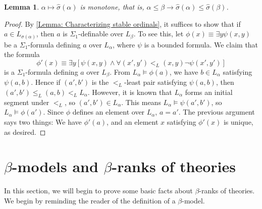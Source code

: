 \documentclass{amsart}
\newtheorem{lemma}[theorem]{Lemma}
\theoremstyle{remark}
\begin{document}
\begin{lemma} \label{Lemma: Stable ordinal monotonicity}
    $\alpha\mapsto \hat{\sigma}(\alpha)$ is monotone, that is, $\alpha\le\beta \to \hat{\sigma}(\alpha)\le\hat{\sigma}(\beta)$.
\end{lemma}
\begin{proof}
    By \autoref{Lemma: Characterizing stable ordinals}, it suffices to show that if $a \in L_{\sigma(\alpha)}$, then $a$ is $\Sigma_1$-definable over $L_\beta$.
    To see this, let $\phi(x)\equiv \exists y\psi(x,y)$ be a $\Sigma_1$-formula defining $a$ over $L_\alpha$, where $\psi$ is a bounded formula.
    We claim that the formula
    \begin{equation*}
        \phi'(x) \equiv \exists y [\psi(x,y)\land \forall (x',y')<_L (x,y) \lnot \psi(x',y')]
    \end{equation*}
    is a $\Sigma_1$-formula defining $a$ over $L_\beta$.
    From $L_\alpha\vDash \phi(a)$, we have $b\in L_\alpha$ satisfying $\psi(a,b)$.
    Hence if $(a',b')$ is the $<_L$-least pair satisfying $\psi(a,b)$, then $(a',b')\le_L (a,b) <_L L_\alpha$. However, it is known that $L_\alpha$ forms an initial segment under $<_L$, so $(a',b')\in L_\alpha$.
    This means $L_\alpha\vDash \psi(a',b')$, so $L_\alpha\vDash \phi(a')$.
    Since $\phi$ defines an element over $L_\alpha$, $a=a'$.
    The previous argument says two things: We have $\phi'(a)$, and an element $x$ satisfying $\phi'(x)$ is unique, as desired.
\end{proof}




\section{\texorpdfstring{$\beta$}{Beta}-models and \texorpdfstring{$\beta$}{beta}-ranks of theories}

In this section, we will begin to prove some basic facts about $\beta$-ranks of theories. We begin by reminding the reader of the definition of a $\beta$-model.
\end{document}
